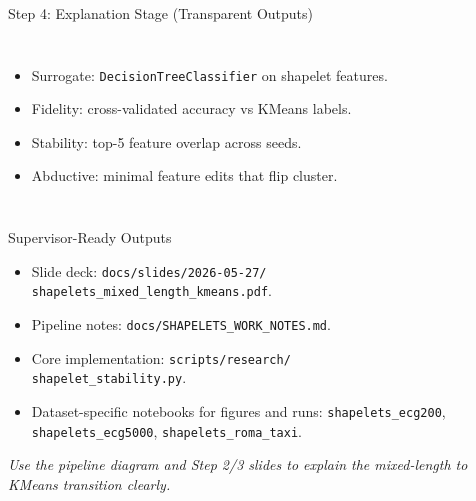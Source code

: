 \documentclass[aspectratio=169]{beamer}
\begin{document}
\begin{frame}{Step 4: Explanation Stage (Transparent Outputs)}
\begin{columns}[T,onlytextwidth]
  \begin{itemize}\footnotesize\setlength\itemsep{4pt}
    \item Surrogate: \texttt{DecisionTreeClassifier} on shapelet features.
    \item Fidelity: cross-validated accuracy vs KMeans labels.
    \item Stability: top-5 feature overlap across seeds.
    \item Abductive: minimal feature edits that flip cluster.
  \end{itemize}
\end{columns}
\end{frame}

\begin{frame}{Supervisor-Ready Outputs}
\begin{itemize}\footnotesize\setlength\itemsep{4pt}
  \item Slide deck: \texttt{docs/slides/2026-05-27/}\\
  \texttt{shapelets\_mixed\_length\_kmeans.pdf}.
  \item Pipeline notes: \texttt{docs/SHAPELETS\_WORK\_NOTES.md}.
  \item Core implementation: \texttt{scripts/research/}\\
  \texttt{shapelet\_stability.py}.
  \item Dataset-specific notebooks for figures and runs: \texttt{shapelets\_ecg200}, \texttt{shapelets\_ecg5000}, \texttt{shapelets\_roma\_taxi}.
\end{itemize}
\vspace{6pt}
{\scriptsize\itshape Use the pipeline diagram and Step 2/3 slides to explain the mixed-length to KMeans transition clearly.}
\end{frame}
\end{document}
